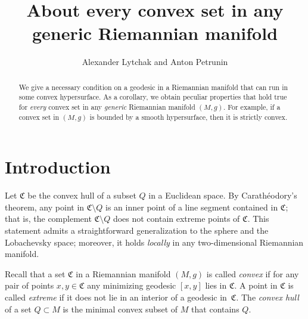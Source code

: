 \documentclass[a4paper,10pt]{article}
\def\thetitle{About every convex set in any\\ generic Riemannian manifold}
\begin{document}

\title{\thetitle}
\author{Alexander Lytchak and Anton Petrunin}
\date{}
\maketitle

\begin{abstract}
We give a necessary condition on a geodesic in a Riemannian manifold that can run in some convex hypersurface.
As a corollary, we obtain peculiar properties that hold true for \emph{every} convex set in any \emph{generic} Riemannian manifold $(M,g)$.
For example, if a convex set in $(M,g)$ is bounded by a smooth hypersurface, then it is strictly convex.
\end{abstract}








\section{Introduction}
Let $\mathfrak{C}$ be the convex hull of a subset $Q$ in a Euclidean space.
By Carathéodory's theorem, any point in $\mathfrak{C}\setminus Q$ is an inner point of a line segment contained in $\mathfrak{C}$;
that is, the complement $\mathfrak{C} \setminus Q$ does not contain extreme points of $\mathfrak{C}$.
This statement admits a straightforward generalization to the sphere and the  Lobachevsky space; moreover, it 
holds \emph{locally} in any two-dimensional Riemannian manifold.

Recall that a set $\mathfrak{C}$ in a Riemannian manifold $(M,g)$ is called \emph{convex} if for any pair of points $x,y\in \mathfrak{C}$ any minimizing geodesic $[x,y]$ lies in $\mathfrak{C}$.
A point in $\mathfrak{C}$ is called \emph{extreme} if it does not lie in an interior of a geodesic in~$\mathfrak{C}$.
The \emph{convex hull} of a set $Q\subset M$ is the minimal convex subset of $M$  that contains $Q$.
\end{document}
